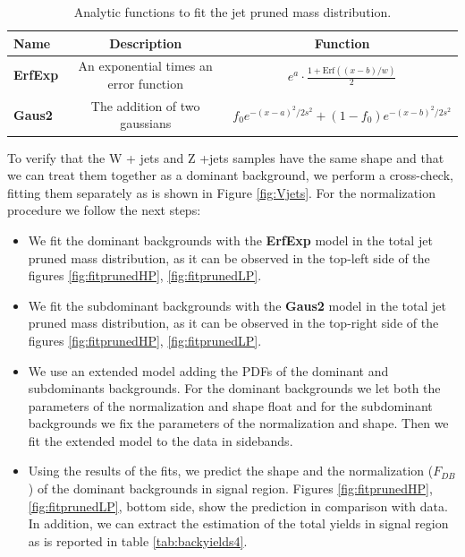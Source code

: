 \def\arraystretch{2.0}
\begin{table}[!ht]
\begin{center}
\caption{Analytic functions to fit the jet pruned mass distribution.}
\label{tab:functions}
\begin{tabular}{lcc} \hline
Name & Description & Function \\ \hline
\textbf{ErfExp} & An exponential times an error function & $e^{a} \cdot \frac{1 + \text{Erf}\left((x-b)/w \right)}{2}$ \\
\textbf{Gaus2}  &  The addition of two gaussians & $f_{0}e^{-(x-a)^{2}/2s^{2}} + (1-f_{0})e^{-(x-b)^{2}/2s^{2}}$ \\ \hline
\end{tabular}
\end{center}
\end{table}

To verify that the W + jets and Z +jets samples have the same shape and that we can treat them together as a dominant background, we perform a cross-check, fitting them separately as is shown in Figure \ref{fig:Vjets}. For the normalization procedure we follow the next steps:

\begin{itemize}
\item
We fit the dominant backgrounds with the \textbf{ErfExp} model in the total jet pruned mass distribution, as it can be observed in the top-left side of the figures \ref{fig:fitprunedHP}, \ref{fig:fitprunedLP}.
\item
We fit the subdominant backgrounds with the \textbf{Gaus2} model in the total jet pruned mass distribution, as it can be observed in the top-right side of the figures \ref{fig:fitprunedHP}, \ref{fig:fitprunedLP}.
\item
We use an extended model adding the PDFs of the dominant and subdominants backgrounds. For the dominant backgrounds we let both the parameters of the normalization and shape float and for the subdominant backgrounds we fix the parameters of the normalization and shape. Then we fit the extended model to the data in sidebands.
\item
Using the results of the fits, we predict the shape and the normalization ($F_{DB}$) of the dominant backgrounds in signal region. Figures \ref{fig:fitprunedHP}, \ref{fig:fitprunedLP}, bottom side, show the prediction  in comparison with data. In addition, we can extract the estimation of the total yields in signal region as is reported in table \ref{tab:backyields4}.
\end{itemize}

